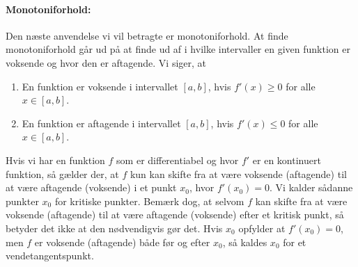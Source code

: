 \paragraph*{Monotoniforhold:}
Den næste anvendelse vi vil betragte er monotoniforhold. At finde monotoniforhold går ud på at finde ud af i hvilke intervaller en given funktion er voksende og hvor den er aftagende. Vi siger, at
\begin{enumerate}
\item En funktion er voksende i intervallet $[a,b]$, hvis $f'(x) \geq 0$ for alle $x \in [a,b]$.
\item En funktion er aftagende i intervallet $[a,b]$, hvis $f'(x) \leq 0$ for alle $x \in [a,b]$.
\end{enumerate}
Hvis vi har en funktion $f$ som er differentiabel og hvor $f'$ er en kontinuert funktion, så gælder der, at $f$ kun kan skifte fra at være voksende (aftagende) til at være aftagende (voksende) i et punkt $x_0$, hvor $f'(x_0)=0$. Vi kalder sådanne punkter $x_0$ for kritiske punkter. Bemærk dog, at selvom $f$ kan skifte fra at være voksende (aftagende) til at være aftagende (voksende) efter et kritisk punkt, så betyder det ikke at den nødvendigvis gør det. Hvis $x_0$ opfylder at $f'(x_0)=0$, men $f$ er voksende (aftagende) både før og efter $x_0$, så kaldes $x_0$ for et vendetangentspunkt.

